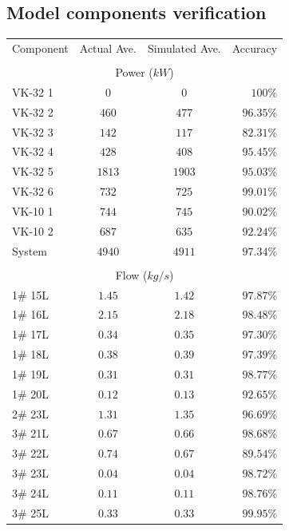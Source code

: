 \begin{appendices}
\chapter{\hspace{0.3cm}Model components verification}\label{Verification}
\newpage
\begin{table}[h!]
	\centering
	\begin{tabular}{lccr}
		\hline 
		Component & Actual Ave. & Simulated  Ave. & Accuracy \\ \hhline{====} 
		\\
		\multicolumn{4}{c}{Power ($ kW $)}
		\\
		VK-32 1 & $  0  $ & $  0  $ & $ 100   $\% \\
		VK-32 2 & $ 460 $ & $ 477 $ & $ 96.35 $\% \\
		VK-32 3 & $ 142 $ & $ 117 $ & $ 82.31 $\% \\
		VK-32 4 & $ 428 $ & $ 408 $ & $ 95.45 $\% \\
		VK-32 5 & $ 1813$ & $ 1903$ & $ 95.03 $\% \\
		VK-32 6 & $ 732 $ & $ 725 $ & $ 99.01 $\% \\
		VK-10 1 & $ 744 $ & $ 745 $ & $ 90.02 $\% \\
		VK-10 2 & $ 687 $ & $ 635 $ & $ 92.24 $\% \\
		System  & $ 4940$ & $4911 $ & $ 97.34 $\% \\
		\\
		\multicolumn{4}{c}{Flow ($ kg/s $)}
		\\
		1\# 15L  & $ 1.45 $ & $ 1.42 $ & $ 97.87 $\% \\
		1\# 16L  & $ 2.15 $ & $ 2.18 $ & $ 98.48 $\% \\
		1\# 17L  & $ 0.34 $ & $ 0.35 $ & $ 97.30 $\% \\
		1\# 18L  & $ 0.38 $ & $ 0.39 $ & $ 97.39 $\% \\
		1\# 19L  & $ 0.31 $ & $ 0.31 $ & $ 98.77 $\% \\
		1\# 20L  & $ 0.12 $ & $ 0.13 $ & $ 92.65 $\% \\
		2\# 23L  & $ 1.31 $ & $ 1.35 $ & $ 96.69 $\% \\
		3\# 21L  & $ 0.67 $ & $ 0.66 $ & $ 98.68 $\% \\
		3\# 22L  & $ 0.74 $ & $ 0.67 $ & $ 89.54 $\% \\
		3\# 23L  & $ 0.04 $ & $ 0.04 $ & $ 98.72 $\% \\
		3\# 24L  & $ 0.11 $ & $ 0.11 $ & $ 98.76 $\% \\
		3\# 25L  & $ 0.33 $ & $ 0.33 $ & $ 99.95 $\% \\

\end{tabular}
\end{table}
\end{appendices}
